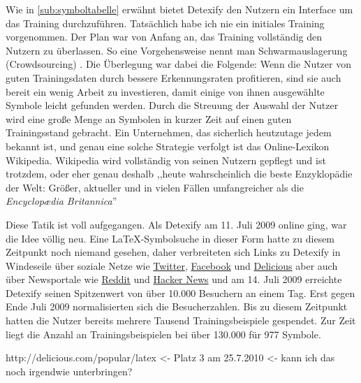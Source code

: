 Wie in \ref{sub:symboltabelle} erwähnt bietet Detexify den Nutzern ein Interface um das Training durchzuführen. Tatsächlich habe ich nie ein initiales Training vorgenommen. Der Plan war von Anfang an, das Training vollständig den Nutzern zu überlassen. So eine Vorgehensweise nennt man Schwarmauslagerung (Crowdsourcing) \cite{Howe:2006p11814}. Die Überlegung war dabei die Folgende: Wenn die Nutzer von guten Trainingsdaten durch bessere Erkennungsraten profitieren, sind sie auch bereit ein wenig Arbeit zu investieren, damit einige von ihnen ausgewählte Symbole leicht gefunden werden. Durch die Streuung der Auswahl der Nutzer wird eine große Menge an Symbolen in kurzer Zeit auf einen guten Trainingsstand gebracht. Ein Unternehmen, das sicherlich heutzutage jedem bekannt ist, und genau eine solche Strategie verfolgt ist das Online-Lexikon Wikipedia. Wikipedia wird vollständig von seinen Nutzern gepflegt und ist trotzdem, oder eher genau deshalb ,,heute wahrscheinlich die beste Enzyklopädie der Welt: Größer, aktueller und in vielen Fällen umfangreicher als die \emph{Encyclop\ae dia Britannica}'' \citep[S.77-86]{andersen2006long}

Diese Tatik ist voll aufgegangen. Als Detexify am 11. Juli 2009 online ging, war die Idee völlig neu. Eine \LaTeX-Symbolsuche in dieser Form hatte zu diesem Zeitpunkt noch niemand gesehen, daher verbreiteten sich Links zu Detexify in Windeseile über soziale Netze wie \href{http://twitter.com}{Twitter}, \href{http://facebook.com}{Facebook} und \href{http://delicious.com}{Delicious} aber auch über Newsportale wie \href{http://reddit.com}{Reddit} und \href{http://news.ycombinator.com}{Hacker News} und am 14. Juli 2009 erreichte Detexify seinen Spitzenwert von über 10.000 Besuchern an einem Tag. Erst gegen Ende Juli 2009 normalisierten sich die Besucherzahlen. Bis zu diesem Zeitpunkt hatten die Nutzer bereits mehrere Tausend Trainingsbeispiele gespendet. Zur Zeit liegt die Anzahl an Trainingsbeispielen bei über 130.000 für 977 Symbole.

\TODO http://delicious.com/popular/latex <- Platz 3 am 25.7.2010 <- kann ich das noch irgendwie unterbringen?


